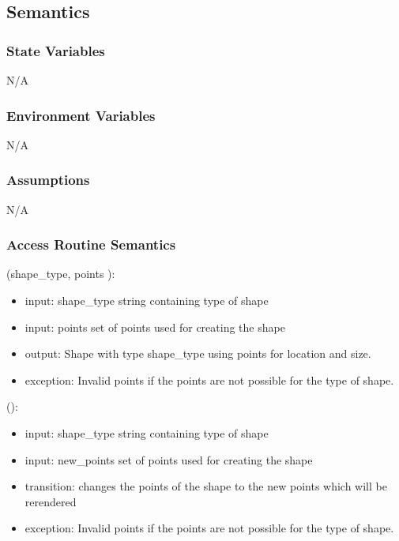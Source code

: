 \documentclass[12pt, titlepage]{article}
\begin{document}
\subsection{Semantics}

\subsubsection{State Variables}

N/A
\subsubsection{Environment Variables}
%
N/A
\subsubsection{Assumptions}
%
N/A
\subsubsection{Access Routine Semantics}

(shape\_type, points ):
\begin{itemize}
\item input: shape\_type string containing type of shape
\item input: points set of points used for creating the shape
\item output: Shape with type shape\_type using points for location and size.
\item exception: Invalid points if the points are not possible for the type of shape.
\end{itemize}

():
\begin{itemize}
\item input: shape\_type string containing type of shape
\item input: new\_points set of points used for creating the shape
\item transition: changes the points of the shape to the new points which will be rerendered
\item exception: Invalid points if the points are not possible for the type of shape.
\end{itemize}
\end{document}
